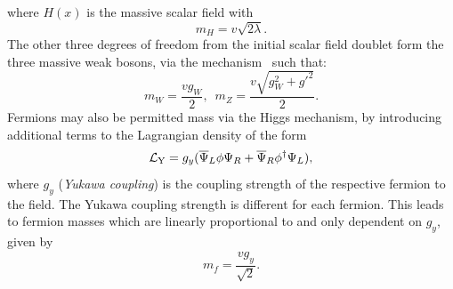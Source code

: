 where $H(x)$ is the massive \BEH{} scalar field with
\begin{equation}
	m_{H} = v\sqrt{2\lambda}.
\end{equation}
The other three degrees of freedom from the initial scalar field doublet form the three massive weak bosons, via the \BEH{} mechanism~\cite{Th:Higgs1, Th:Higgs2, Th:Higgs3} such that:
\begin{equation}
	m_{W} = \frac{vg_{W}}{2},
	\,\,\,
	m_{Z} = \frac{v\sqrt{g_{W}^{2}+g'^{2}}}{2}.
\end{equation}
Fermions may also be permitted mass via the Higgs mechanism, by introducing additional terms to the Lagrangian density of the form 
\begin{equation} \label{eq:LY}
	\mathcal{L}_{\mathrm{Y}} = g_{y}(\overline{\Psi}_L\phi\Psi_R+\overline{\Psi}_R\phi^{\dagger}\Psi_L), 
\end{equation}
where $g_{y}$ (\textit{Yukawa coupling}) is the coupling strength of the respective fermion to the \BEH{} field.
The Yukawa coupling strength is different for each fermion.
This leads to fermion masses which are linearly proportional to and only dependent on $g_{y}$, given by
\begin{equation}
	m_{f}=\frac{vg_{y}}{\sqrt{2}}.
\end{equation}

